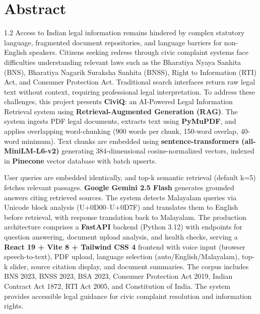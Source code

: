 \chapter*{Abstract}%
%
\vspace{-25pt}

\begin{spacing}{1.2}
\noindent Access to Indian legal information remains hindered by complex statutory language, fragmented document repositories, and language barriers for non-English speakers. Citizens seeking redress through civic complaint systems face difficulties understanding relevant laws such as the Bharatiya Nyaya Sanhita (BNS), Bharatiya Nagarik Suraksha Sanhita (BNSS), Right to Information (RTI) Act, and Consumer Protection Act. Traditional search interfaces return raw legal text without context, requiring professional legal interpretation. To address these challenges, this project presents \textbf{CiviQ}: an AI-Powered Legal Information Retrieval system using \textbf{Retrieval-Augmented Generation (RAG)}. The system ingests PDF legal documents, extracts text using \textbf{PyMuPDF}, and applies overlapping word-chunking (900 words per chunk, 150-word overlap, 40-word minimum). Text chunks are embedded using \textbf{sentence-transformers (all-MiniLM-L6-v2)} generating 384-dimensional cosine-normalized vectors, indexed in \textbf{Pinecone} vector database with batch upserts.

\vspace{8pt}

\noindent User queries are embedded identically, and top-k semantic retrieval (default k=5) fetches relevant passages. \textbf{Google Gemini 2.5 Flash} generates grounded answers citing retrieved sources. The system detects Malayalam queries via Unicode block analysis (U+0D00--U+0D7F) and translates them to English before retrieval, with response translation back to Malayalam. The production architecture comprises a \textbf{FastAPI} backend (Python 3.12) with endpoints for question answering, document upload analysis, and health checks, serving a \textbf{React 19 + Vite 8 + Tailwind CSS 4} frontend with voice input (browser speech-to-text), PDF upload, language selection (auto/English/Malayalam), top-k slider, source citation display, and document summaries. The corpus includes BNS 2023, BNSS 2023, BSA 2023, Consumer Protection Act 2019, Indian Contract Act 1872, RTI Act 2005, and Constitution of India. The system provides accessible legal guidance for civic complaint resolution and information rights.
\end{spacing}

\thispagestyle{plain}
